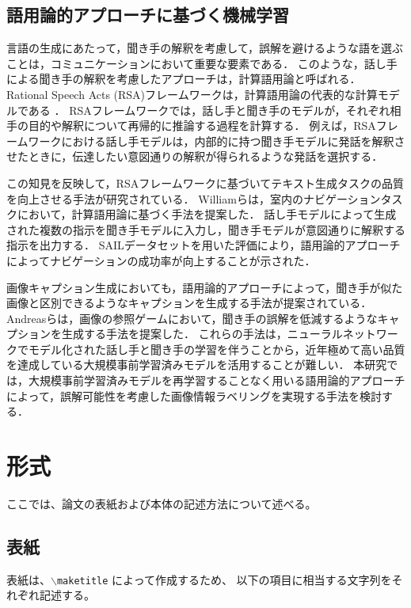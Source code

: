 \documentclass[a4paper,11pt]{jreport}
\begin{document}
\section{語用論的アプローチに基づく機械学習}
\label{sec:relwork_pragmatic_ml}
言語の生成にあたって，聞き手の解釈を考慮して，誤解を避けるような語を選ぶことは，コミュニケーションにおいて重要な要素である．
このような，話し手による聞き手の解釈を考慮したアプローチは，計算語用論と呼ばれる\cite{Fried2023}．
Rational Speech Acts (RSA)フレームワークは，計算語用論の代表的な計算モデルである \cite{Frank2012,Goodman2016}．
RSAフレームワークでは，話し手と聞き手のモデルが，それぞれ相手の目的や解釈について再帰的に推論する過程を計算する．
例えば，RSAフレームワークにおける話し手モデルは，内部的に持つ聞き手モデルに発話を解釈させたときに，伝達したい意図通りの解釈が得られるような発話を選択する．

この知見を反映して，RSAフレームワークに基づいてテキスト生成タスクの品質を向上させる手法が研究されている\cite{Fried2017}．
Williamら\cite{Williams2015}は，室内のナビゲーションタスクにおいて，計算語用論に基づく手法を提案した．
話し手モデルによって生成された複数の指示を聞き手モデルに入力し，聞き手モデルが意図通りに解釈する指示を出力する．
SAILデータセットを用いた評価により，語用論的アプローチによってナビゲーションの成功率が向上することが示された．

画像キャプション生成においても，語用論的アプローチによって，聞き手が似た画像と区別できるようなキャプションを生成する手法が提案されている\cite{Vedantam2017,Cohn-Gordon2018,Nie2020}．
Andreasら\cite{Andreas2016}は，画像の参照ゲームにおいて，聞き手の誤解を低減するようなキャプションを生成する手法を提案した．
これらの手法は，ニューラルネットワークでモデル化された話し手と聞き手の学習を伴うことから，近年極めて高い品質を達成している大規模事前学習済みモデルを活用することが難しい．
本研究では，大規模事前学習済みモデルを再学習することなく用いる語用論的アプローチによって，誤解可能性を考慮した画像情報ラベリングを実現する手法を検討する．

\chapter{形式}

ここでは、論文の表紙および本体の記述方法について述べる。

\section{表紙}

表紙は、{\tt $\backslash$maketitle} によって作成するため、
以下の項目に相当する文字列をそれぞれ記述する。
\end{document}
